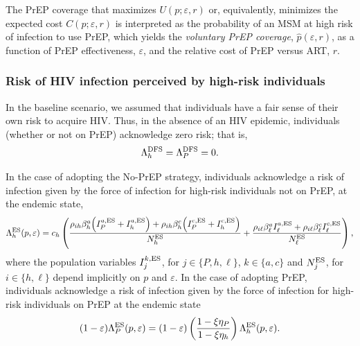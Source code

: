 \documentclass[12pt]{article}
\begin{document}
The PrEP coverage that maximizes $U(p;\varepsilon, r)$ or, equivalently, minimizes the expected cost $C(p;\varepsilon, r)$ is interpreted as the probability of an MSM at high risk of infection to use PrEP, which yields the \textit{voluntary PrEP coverage}, $\hat{p}(\varepsilon,r)$, as a function of PrEP effectiveness, $\varepsilon$, and the relative cost of PrEP versus ART, $r$. 


\subsubsection{Risk of HIV infection perceived by high-risk individuals} \label{sec:PerceivedRisk}

In the baseline scenario, we assumed that individuals have a fair sense of their own risk to acquire HIV. Thus, in the absence of an HIV epidemic, individuals (whether or not on PrEP) acknowledge zero risk; that is,
\begin{equation}
	\Lambda_h^{\rm DFS}=\Lambda_P^{\rm DFS}=0.
\end{equation} 

In the case of adopting the No-PrEP strategy, individuals acknowledge a risk of infection given by the force of infection for high-risk individuals not on PrEP, at the endemic state,
\begin{equation}
	\Lambda_h^{\rm ES}(p,\varepsilon) = c_h \left( \frac{\rho_{ih} \beta_h^a \Big(I_P^{a,\rm ES} + I_h^{a,\rm ES}\Big) + \rho_{ih} \beta_h^c \Big(I_P^{c,\rm ES} +I_h^{c,\rm ES} \Big)}{N_h^{\rm ES}} + \frac{\rho_{i\ell} \beta_\ell^a I_\ell^{a,\rm ES} + \rho_{i\ell} \beta_\ell^c I_\ell^{c,\rm ES}}{N_\ell^{\rm ES}}\right),
\end{equation}
where the population variables $I_j^{k,\rm ES}$, for $j\in\{P,h,\ell\}$, $k\in\{a,c\}$ and $N_j^{\rm ES}$, for $i\in\{h,\ell\}$ depend implicitly on $p$ and $\varepsilon$. In the case of adopting PrEP, individuals acknowledge a risk of infection given by the force of infection for high-risk individuals on PrEP at the endemic state
\begin{equation} \label{eq:Lambda_P_ES}
	(1-\varepsilon) \Lambda_P^{\rm ES}(p,\varepsilon) = (1-\varepsilon) \left(\frac{1-\xi \eta_P}{1-\xi \eta_h}\right)\Lambda_h^{\rm ES}(p,\varepsilon).
\end{equation} 
\end{document}
